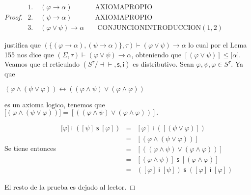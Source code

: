 \begin{proof}
    \(\displaystyle \begin{array}{llll} 1.\; & (\varphi \rightarrow \alpha ) & & \text{AXIOMAPROPIO} \\ 2.\; & (\psi \rightarrow \alpha ) & & \text{AXIOMAPROPIO} \\ 3.\; & (\varphi \vee \psi )\rightarrow \alpha & & \text{ CONJUNCIONINTRODUCCION}(1,2) \end{array} \)

    justifica que \((\{(\varphi \rightarrow \alpha ),(\psi \rightarrow \alpha )\},\tau )\vdash (\varphi \vee \psi )\rightarrow \alpha \) lo cual por el Lema 155 nos dice que \((\Sigma ,\tau )\vdash (\varphi \vee \psi )\rightarrow \alpha \), obteniendo que \([(\varphi \vee \psi )]\leq \lbrack \alpha ].\)
    Veamos que el reticulado \((S^{\tau }/\mathrm{\dashv \vdash },\mathsf{s}, \mathsf{i})\) es distributivo. Sean \(\varphi ,\psi ,\varphi \in S^{\tau }.\) Ya que

    \(\displaystyle (\varphi \wedge (\psi \vee \varphi ))\leftrightarrow ((\varphi \wedge \psi )\vee (\varphi \wedge \varphi )) \)

    es un axioma logico, tenemos que
    \(\displaystyle \lbrack (\varphi \wedge (\psi \vee \varphi ))]=[((\varphi \wedge \psi )\vee (\varphi \wedge \varphi ))]. \)

    Se tiene entonces
    \(\displaystyle \begin{array}{lll} \lbrack \varphi ]\;\mathsf{i}\;([\psi ]\;\mathsf{s}\;[\varphi ]) & = & [\varphi ]\;\mathsf{i}\;([(\psi \vee \varphi )]) \\ & = & [(\varphi \wedge (\psi \vee \varphi ))] \\ & = & [((\varphi \wedge \psi )\vee (\varphi \wedge \varphi ))] \\ & = & [(\varphi \wedge \psi )]\;\mathsf{s}\;[(\varphi \wedge \varphi )] \\ & = & ([\varphi ]\;\mathsf{i}\;[\psi ])\;\mathsf{s}\;([\varphi ]\;\mathsf{i} \;[\varphi ]) \end{array} \)

    El resto de la prueba es dejado al lector.
  \end{proof}

